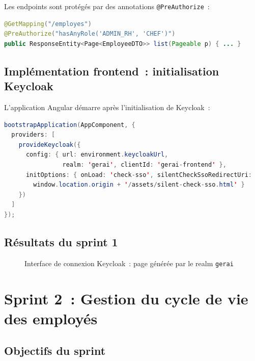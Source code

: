 Les endpoints sont protégés par des annotations \texttt{@PreAuthorize}~:
\begin{lstlisting}[language=Java]
@GetMapping("/employes")
@PreAuthorize("hasAnyRole('ADMIN_RH', 'CHEF')")
public ResponseEntity<Page<EmployeeDTO>> list(Pageable p) { ... }
\end{lstlisting}

\subsection{Implémentation frontend~: initialisation Keycloak}

L'application Angular démarre après l'initialisation de Keycloak~:

\begin{lstlisting}[language=Java,caption={Initialisation Keycloak dans main.ts}]
bootstrapApplication(AppComponent, {
  providers: [
    provideKeycloak({
      config: { url: environment.keycloakUrl,
                realm: 'gerai', clientId: 'gerai-frontend' },
      initOptions: { onLoad: 'check-sso', silentCheckSsoRedirectUri:
        window.location.origin + '/assets/silent-check-sso.html' }
    })
  ]
});
\end{lstlisting}

\subsection{Résultats du sprint 1}

\begin{figure}[H]
  \centering
  \caption{Interface de connexion Keycloak~: page générée par le realm \texttt{gerai}}
  \label{fig:s1_login}
\end{figure}

\section{Sprint 2~: Gestion du cycle de vie des employés}

\subsection{Objectifs du sprint}

